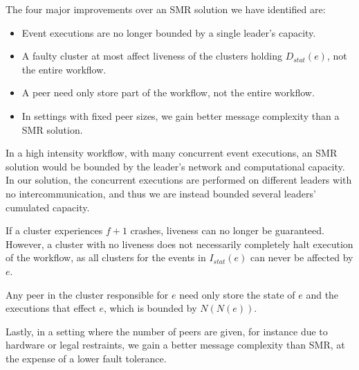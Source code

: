 \documentclass{article}
\begin{document}
    The four major improvements over an SMR solution we have identified are:
    \begin{itemize}
    	\item Event executions are no longer bounded by a single leader's capacity.
    	\item A faulty cluster at most affect liveness of the clusters holding $D_{stat}(e)$, not the entire workflow.
    	\item A peer need only store part of the workflow, not the entire workflow.
    	\item In settings with fixed peer sizes, we gain better message complexity than a SMR solution.
    \end{itemize}

    In a high intensity workflow, with many concurrent event executions, an SMR solution would be bounded by the leader's network and computational capacity.
    In our solution, the concurrent executions are performed on different leaders with no intercommunication, and thus we are instead bounded several leaders' cumulated capacity.

    If a cluster experiences $f+1$ crashes, liveness can no longer be guaranteed.
    However, a cluster with no liveness does not necessarily completely halt execution of the workflow, as all clusters for the events in $I_{stat}(e)$ can never be affected by $e$.

    Any peer in the cluster responsible for $e$ need only store the state of $e$ and the executions that effect $e$, which is bounded by $N(N(e))$.

    Lastly, in a setting where the number of peers are given, for instance due to hardware or legal restraints, we gain a better message complexity than SMR, at the expense of a lower fault tolerance.


\end{document}
